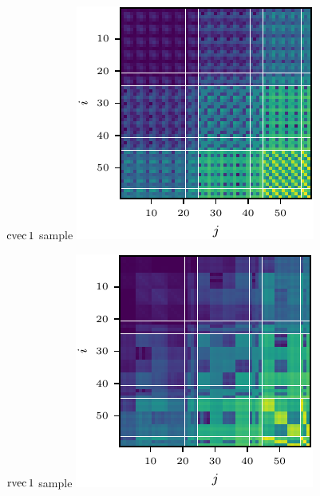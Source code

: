 \begin{figure}[!h]
  \centering
  \begin{minipage}[t]{0.49\linewidth}
    \centering
    $\operatorname{cvec} 1$ sample\vspace{1ex}
    \includegraphics[width=1.0\linewidth]{../kfs/plots/synthetic_cvec_mcfisher_1.pdf}
  \end{minipage}
  \hfill
  \begin{minipage}[t]{0.49\linewidth}
    \centering
    $\operatorname{rvec} 1$ sample\vspace{1ex}
    \includegraphics[width=1.0\linewidth]{../kfs/plots/synthetic_rvec_mcfisher_1.pdf}

\end{minipage}
\end{figure}

